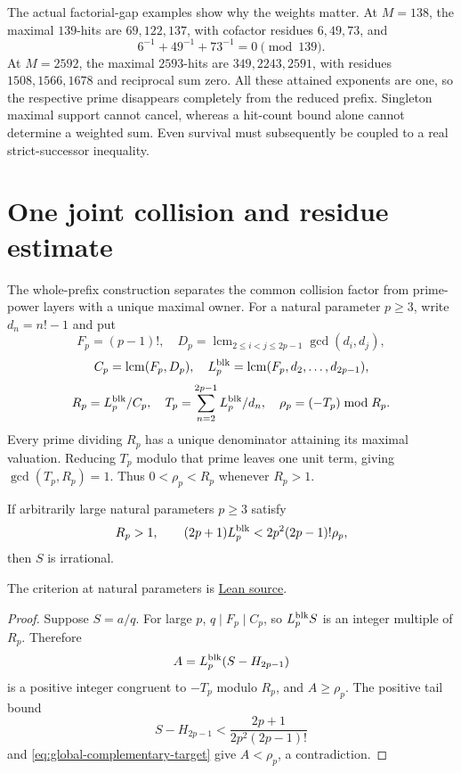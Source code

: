 \documentclass[11pt]{article}
\begin{document}
The actual factorial-gap examples show why the weights matter.  At
$M=138$, the maximal $139$-hits are $69,122,137$, with cofactor residues
$6,49,73$, and
\[
6^{-1}+49^{-1}+73^{-1}=0\pmod{139}.
\]
At $M=2592$, the maximal $2593$-hits are $349,2243,2591$, with residues
$1508,1566,1678$ and reciprocal sum zero.  All these attained exponents are
one, so the respective prime disappears completely from the reduced prefix.
Singleton maximal support cannot cancel, whereas a hit-count bound alone
cannot determine a weighted sum.  Even survival must subsequently be coupled
to a real strict-successor inequality.

\section{One joint collision and residue estimate}\label{sec:projection}

The whole-prefix construction separates the common collision factor from
prime-power layers with a unique maximal owner.  For a natural parameter
$p\ge3$, write $d_n=n!-1$ and put
\[
F_p=(p-1)!,\quad
D_p=\operatorname{lcm}_{2\le i<j\le2p-1}\gcd(d_i,d_j),
\]
\[
C_p=\operatorname{lcm}(F_p,D_p),\quad
L_p^{\rm blk}=\operatorname{lcm}(F_p,d_2,\ldots,d_{2p-1}),
\]
\[
R_p=L_p^{\rm blk}/C_p,\quad
T_p=\sum_{n=2}^{2p-1}L_p^{\rm blk}/d_n,\quad
\rho_p=(-T_p)\bmod R_p.
\]
Every prime dividing $R_p$ has a unique denominator attaining its maximal
valuation.  Reducing $T_p$ modulo that prime leaves one unit term, giving
$\gcd(T_p,R_p)=1$.  Thus $0<\rho_p<R_p$ whenever $R_p>1$.

\begin{proposition}
\label{res:global-complementary-criterion}
If arbitrarily large natural parameters $p\ge3$ satisfy
\begin{equation}
R_p>1,\qquad
(2p+1)L_p^{\rm blk}<2p^2(2p-1)!\rho_p,
\label{eq:global-complementary-target}
\end{equation}
then $S$ is irrational.
\end{proposition}

\noindent The criterion at natural parameters is
\href{https://github.com/wcook04/plectis-erdos/blob/f36a98bf3d3e6f65f1074e3b800e3293d5b8a51a/ErdosProblems/Erdos68/PaperCompleteExisting.lean#L156}{Lean source}.
\begin{proof}
Suppose $S=a/q$.  For large $p$, $q\mid F_p\mid C_p$, so
$L_p^{\rm blk}S$ is an integer multiple of $R_p$.  Therefore
\[
A=L_p^{\rm blk}(S-H_{2p-1})
\]
is a positive integer congruent to $-T_p$ modulo $R_p$, and $A\ge\rho_p$.
The positive tail bound
\[
S-H_{2p-1}<\frac{2p+1}{2p^2(2p-1)!}
\]
and \eqref{eq:global-complementary-target} give $A<\rho_p$, a contradiction.
\end{proof}
\end{document}
